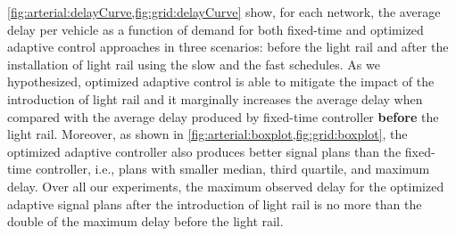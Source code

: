 \cref{fig:arterial:delayCurve,fig:grid:delayCurve} show, for each network, the
average delay per vehicle as a function of demand for both fixed-time
and optimized adaptive control approaches in three scenarios: before the light
rail and after the installation of light rail using the slow and the fast
schedules.
%
As we hypothesized, optimized adaptive control is able to mitigate the impact of
the introduction of light rail and it marginally increases the average delay
when compared with the average delay produced by fixed-time controller
\textbf{before} the light rail.
%
Moreover, as shown in \cref{fig:arterial:boxplot,fig:grid:boxplot}, the
optimized adaptive controller also produces better signal plans than the
fixed-time controller, i.e., plans with smaller median, third quartile, and
maximum delay.
%
Over all our experiments, the maximum observed delay for the optimized adaptive
signal plans after the introduction of light rail is no more than
%
%
the double of the maximum delay before the light rail.
%


